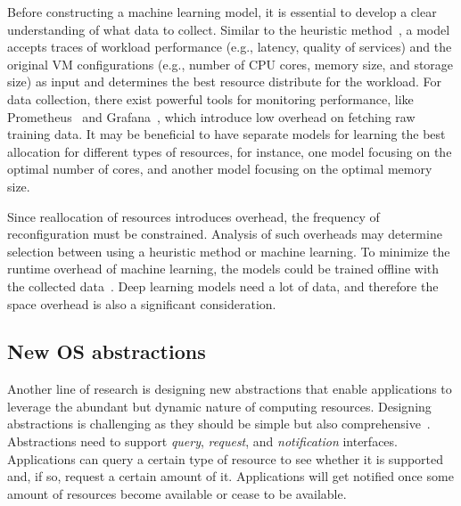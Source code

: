 Before constructing a machine learning model, it is essential to
develop a clear understanding of what data to collect. Similar to
the heuristic method~\cite{sedaghat2013virtual}, a model accepts
traces of workload performance (e.g., latency, quality of services)
and the original VM configurations (e.g., number of CPU cores,
memory size, and storage size) as input and determines the best
resource distribute for the workload.  For data collection, there
exist powerful tools for monitoring performance, like
Prometheus~\cite{sukhija2019towards} and Grafana~\cite{Grafana},
which introduce low overhead on fetching raw training data.  It may
be beneficial to have separate models for learning the best allocation
for different types of resources, for instance, one model focusing
on the optimal number of cores, and another model focusing on the
optimal memory size.

Since reallocation of resources introduces overhead,
the frequency of reconfiguration must be constrained.
Analysis of such overheads may determine
selection between using a heuristic method or machine learning.
To minimize the runtime overhead of machine learning,
the models could be trained offline with the collected
data~\cite{zhang2019learned}. Deep learning
models need a lot of data, and therefore the space overhead is also
a significant consideration.

\begin{comment}
In the best-case scenario, if the
overheads for space, trace collection, and running the learning
algorithms cannot diminish the benefit of having such a machine
learning approach, that would strongly encourage us to use such models
for learning the policies on resource reconfiguration.
\end{comment}

\subsection{New OS abstractions}
Another line of research is designing new abstractions that enable
applications to leverage the abundant but dynamic nature of computing
resources.  Designing abstractions is challenging as they should be
simple but also comprehensive~\cite{lampson1983hints}.  Abstractions
need to support \emph{query}, \emph{request}, and \emph{notification}
interfaces. Applications can query a certain type of resource to see
whether it is supported and, if so, request a certain amount of it.
Applications will get notified once some amount of resources become
available or cease to be available.

